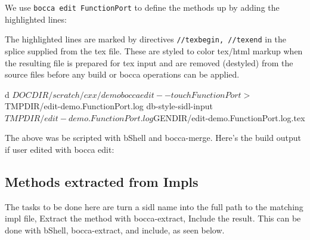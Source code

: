 \documentclass{article}
\providecommand{\bShell}[2][]{}
\begin{document}
We use \texttt{bocca edit FunctionPort} to define the methods up by adding the highlighted lines:

The highlighted lines are marked by directives \texttt{//texbegin, //texend} in the splice
supplied from the tex file. These are styled to color tex/html markup when the
resulting file is prepared for tex input and are removed (destyled) from the source files
before any build or bocca operations can be applied.

\begin{latexonly}
\bShell[env USE_COLORS=0 bash]
cd $DOCDIR/scratch/cxx/demo
bocca edit --touch FunctionPort > $TMPDIR/edit-demo.FunctionPort.log
db-style-sidl-input  $TMPDIR/edit-demo.FunctionPort.log $GENDIR/edit-demo.FunctionPort.log.tex
\eShell
\end{latexonly}

The above was be scripted with bShell and bocca-merge.
Here's the build output if user edited with bocca edit:



\subsection{Methods extracted from Impls}
\label{sec:readmethod}
The tasks to be done here are turn a sidl name into the full path to the matching impl file,
Extract the method with bocca-extract,
Include the result.
This can be done with bShell, bocca-extract, and include, as seen below.


\end{document}
